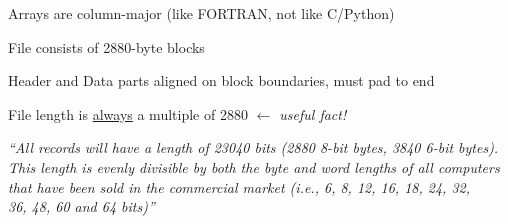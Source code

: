 \documentclass[20pt,landscape]{foils}
\begin{document}
\begin{list0}
\begin{list2}
\begin{list3}
    \end{list3}
\vspace*{-0.2cm}
    \item Arrays are column-major (like FORTRAN, not like C/Python)
\vspace*{-0.2cm}
    \item File consists of 2880-byte blocks
\vspace*{-0.2cm}
    \begin{list3}
      \item Header and Data parts aligned on block boundaries, must pad to end
      \item File length is \underline{always} a multiple of 2880
            \hspace*{1em} {\color{darkred}\sl $\longleftarrow$ useful fact!}
      \item[] \hspace*{1.5em}
              \begin{minipage}{25cm}
                {\sl\small\color{darkgrey}
                ``All records will have a length of 23040 bits
                  (2880 8-bit bytes, 3840 6-bit bytes).\\
                  This length is evenly divisible by both the byte and word
                  lengths of all computers \\
                  that have been sold in the commercial market
                  (i.e., 6, 8, 12, 16, 18, 24, 32, \\
                  36, 48, 60 and 64 bits)''}
              \end{minipage}
    \end{list3}
  \end{list2}
\end{list0}

\end{document}
